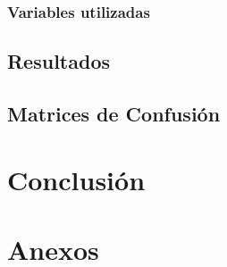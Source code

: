 \documentclass[12pt,a4paper,onecolumn]{article}
\begin{document}
\subsubsection{Variables utilizadas}

\subsection{Resultados}


\subsection{Matrices de Confusión}


\section{Conclusión}



\clearpage
\appendix
\section*{Anexos}

%

%



\pagebreak
\singlespacing
\nocite{*}


\end{document}
